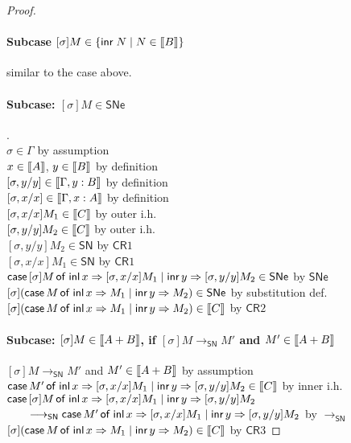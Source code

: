 \documentclass{article}
\newcommand{\SN}{\mathsf{SN}}
\newcommand{\SNe}{\mathsf{SNe}}
\newcommand{\CR}{\mathsf{CR}}
\newcommand{\redSN}{\longrightarrow_\SN}
\def\lv{\mathopen{{[\kern-0.14em[}}}    %
\def\rv{\mathclose{{]\kern-0.14em]}}}   %
\newcommand{\den}[1]{\lv #1 \rv}
\begin{document}
\begin{proof}
\paragraph{Subcase $[\sigma]M \in \{\inr N \mid N \in \den{B}\}$}$\;$\\[1em]
similar to the case above.

\paragraph{Subcase: $[\sigma]M \in \SNe$}.$\;$\\
$\sigma \in \Gamma$ \hfill by assumption \\
$x \in \den{A}$, $y \in \den{B}$  \hfill by definition \\
$[\sigma, y/y] \in \den{\Gamma, y:B}$ \hfill by definition \\
$[\sigma, x/x] \in \den{\Gamma, x:A}$ \hfill by definition \\
$[\sigma, x/x]M_1 \in \den{C}$ \hfill by outer i.h. \\
$[\sigma, y/y]M_2 \in \den{C}$ \hfill by outer i.h. \\
$[\sigma, y/y]M_2 \in \SN$ \hfill by $\CR1$ \\
$[\sigma, x/x]M_1 \in \SN$ \hfill by $\CR1$ \\
$\caseof{[\sigma]M}{[\sigma, x/x]M_1}{[\sigma, y/y]M_2} \in \SNe$ \hfill by $\SNe$ \\
$[\sigma](\caseof{M}{M_1}{M_2}) \in \SNe$ \hfill by substitution def. \\
$[\sigma](\caseof{M}{M_1}{M_2}) \in \den{C}$ \hfill by $\CR2$


\paragraph{Subcase:  $[\sigma]M \in \den{A + B}$, if $[\sigma]M \redSN M'$ and $M' \in \den{A+B}$}$\;$\\
$[\sigma]M \redSN M'$ and $M' \in \den{A+B}$ \hfill by assumption \\
$\caseof{M'}{[\sigma,x/x]M_1}{[\sigma,y/y]M_2} \in \den{C}$ \hfill by inner i.h. \\
$\textsf{case}\,[\sigma]M\,\textsf{of inl}\,x \Rightarrow [\sigma,x/x]M_1 \mid \textsf{inr}\,y \Rightarrow [\sigma,y/y]M_2 $ \\
$\qquad\redSN
\caseof{M'}{[\sigma,x/x]M_1}{[\sigma,y/y]M_2}$ \hfill by $\redSN$\\
$[\sigma](\caseof{M}{M_1}{M_2}) \in \den{C}$ \hfill by $\CR3$
 \end{proof}
\end{document}
